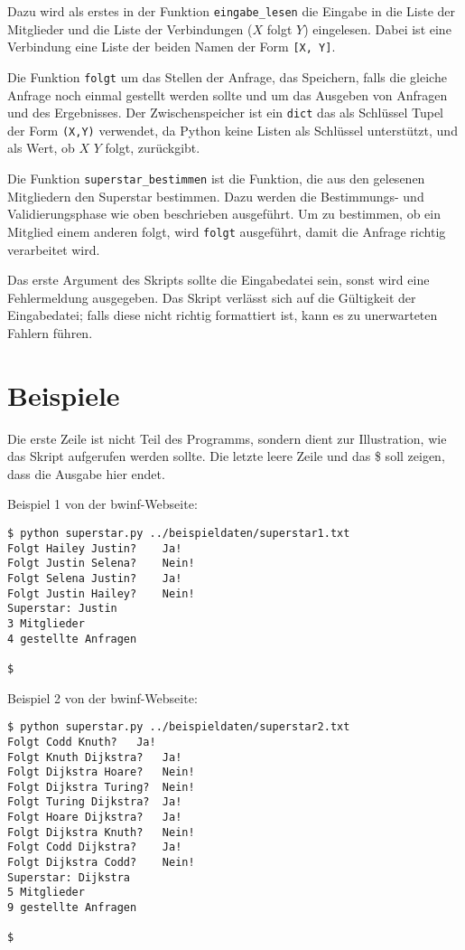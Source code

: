 \documentclass[a4paper,10pt,ngerman]{scrartcl}
\begin{document}
Dazu wird als erstes in der Funktion \texttt{eingabe\_lesen} die Eingabe in die Liste der Mitglieder und die Liste der Verbindungen ($X$ folgt $Y$) eingelesen. Dabei ist eine Verbindung eine Liste der beiden Namen der Form \texttt{[X, Y]}. 

Die Funktion \texttt{folgt} um das Stellen der Anfrage, das Speichern, falls die gleiche Anfrage noch einmal gestellt werden sollte und um das Ausgeben von Anfragen und des Ergebnisses. Der Zwischenspeicher ist ein \texttt{dict} das als Schlüssel Tupel der Form \texttt{(X,Y)} verwendet, da Python keine Listen als Schlüssel unterstützt, und als Wert, ob $X$ $Y$ folgt, zurückgibt. 

Die Funktion \texttt{superstar\_bestimmen} ist die Funktion, die aus den gelesenen Mitgliedern den Superstar bestimmen. Dazu werden die Bestimmungs- und Validierungsphase wie oben beschrieben ausgeführt. Um zu bestimmen, ob ein Mitglied einem anderen folgt, wird \texttt{folgt} ausgeführt, damit die Anfrage richtig verarbeitet wird.

Das erste Argument des Skripts sollte die Eingabedatei sein, sonst wird eine Fehlermeldung ausgegeben. Das Skript verlässt sich auf die Gültigkeit der Eingabedatei; falls diese nicht richtig formattiert ist, kann es zu unerwarteten Fahlern führen.

\clearpage

\section{Beispiele}
Die erste Zeile ist nicht Teil des Programms, sondern dient zur Illustration, wie das Skript aufgerufen werden sollte. Die letzte leere Zeile und das \$ soll zeigen, dass die Ausgabe hier endet.\newline 

Beispiel 1 von der bwinf-Webseite:
\begin{lstlisting}
$ python superstar.py ../beispieldaten/superstar1.txt
Folgt Hailey Justin? 	Ja!
Folgt Justin Selena? 	Nein!
Folgt Selena Justin? 	Ja!
Folgt Justin Hailey? 	Nein!
Superstar: Justin
3 Mitglieder
4 gestellte Anfragen

$
\end{lstlisting}

Beispiel 2 von der bwinf-Webseite:
\begin{lstlisting}
$ python superstar.py ../beispieldaten/superstar2.txt
Folgt Codd Knuth? 	Ja!
Folgt Knuth Dijkstra? 	Ja!
Folgt Dijkstra Hoare? 	Nein!
Folgt Dijkstra Turing? 	Nein!
Folgt Turing Dijkstra? 	Ja!
Folgt Hoare Dijkstra? 	Ja!
Folgt Dijkstra Knuth? 	Nein!
Folgt Codd Dijkstra? 	Ja!
Folgt Dijkstra Codd? 	Nein!
Superstar: Dijkstra
5 Mitglieder
9 gestellte Anfragen

$
\end{lstlisting}
\end{document}
